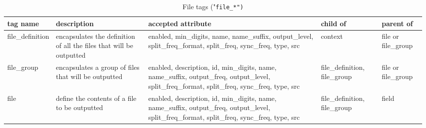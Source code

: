 \documentclass[../main/NEMO_manual]{subfiles}
\begin{document}
\begin{table}
  \scriptsize
  \begin{tabularx}{\textwidth}{|l|X|X|X|l|}
    \hline
    tag name                                                            &
    description                                                         &
    accepted attribute                                                  &
    child of                                                            &
    parent of           \\
    \hline
    \hline
    file\_definition                                                    &
    encapsulates the definition of all the files that will be outputted &
    enabled, min\_digits, name, name\_suffix, output\_level,
    split\_freq\_format, split\_freq, sync\_freq, type, src             &
    context                                                             &
    file or file\_group \\
    \hline
    file\_group                                                         &
    encapsulates a group of files that will be outputted                &
    enabled, description, id, min\_digits, name, name\_suffix, output\_freq, output\_level,
    split\_freq\_format, split\_freq, sync\_freq, type, src             &
    file\_definition, file\_group                                       &
    file or file\_group \\
    \hline
    file                                                                &
    define the contents of a file to be outputted                       &
    enabled, description, id, min\_digits, name, name\_suffix, output\_freq, output\_level,
    split\_freq\_format, split\_freq, sync\_freq, type, src             &
    file\_definition, file\_group                                       &
    field               \\
    \hline
  \end{tabularx}
  \caption{File tags ("\tt{file\_*}")}
\end{table}
\end{document}
